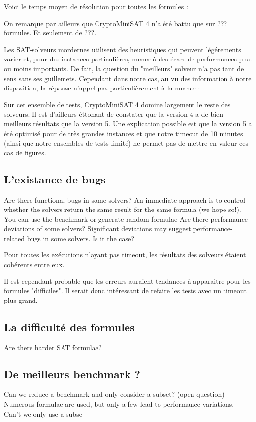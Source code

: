 \documentclass[11pt,a4paper]{article}
\begin{document}
Voici le temps moyen de résolution pour toutes les formules :

On remarque par ailleurs que CryptoMiniSAT 4 n'a été battu que sur
??? formules. Et seulement de ???.

Les SAT-solveurs mordernes utilisent des heuristiques qui peuvent légérements varier et, pour des instances particulières, mener à des écars de performances plus ou moins importants. De fait, la question du "meilleurs" solveur n'a pas tant de sens sans ses guillemets. Cependant dans notre cas, au vu des information à notre disposition, la réponse n'appel pas particulièrement à la nuance :

Sur cet ensemble de tests, CryptoMiniSAT 4 domine largement le reste des solveurs.
Il est d'ailleurs éttonant de constater que la version 4 a de bien meilleurs résultats que la version 5. Une explication possible est que la version 5 a été optimisé pour de très grandes instances et que notre timeout de 10 minutes (ainsi que notre ensembles de tests limité) ne permet pas de mettre en valeur ces cas de figures.

\subsection{L'existance de bugs}
 Are there functional bugs in some solvers?
 An immediate approach is to control whether the solvers return the same
result for the same formula (we hope so!). You can use the benchmark or
generate random formulae
 Are there performance deviations of some solvers?
 Significant deviations may suggest performance-related bugs in some
solvers. Is it the case?


Pour toutes les exécutions n'ayant pas timeout, les résultats des solveurs étaient cohérents entre eux.

Il est cependant probable que les erreurs auraient tendances à apparaitre pour les formules "difficiles". Il serait donc intéressant de refaire les tests avec un timeout plus grand. 

\subsection{La difficulté des formules}
 Are there harder SAT formulae?
 



\subsection{De meilleurs benchmark ?}
Can we reduce a benchmark and only consider a subset? (open question)
Numerous formulae are used, but only a few lead to performance variations.
Can’t we only use a subse
\end{document}
